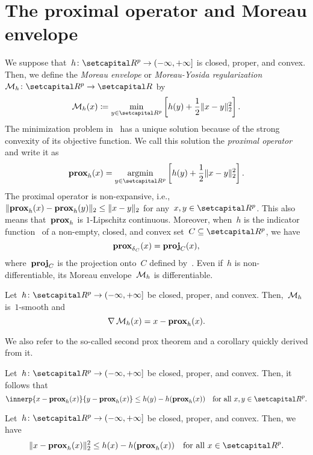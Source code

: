 \documentclass[../main]{subfiles}
\begin{document}
\section{The proximal operator and Moreau envelope}
We suppose that~$h \colon \setR^p \to (-\infty, +\infty]$ is closed, proper, and convex.
Then, we define the \emph{Moreau envelope} or \emph{Moreau-Yosida regularization}~$\envelope_h \colon \setR^p \to \setR$ by
\begin{equation} \label{eq:Moreau_env}
    \envelope_h(x) \coloneqq \min_{y \in \setR^p} \left[ h(y) + \frac{1}{2} \norm{x - y}_2^2 \right] 
.\end{equation} 
The minimization problem in~ has a unique solution because of the strong convexity of its objective function.
We call this solution the \emph{proximal operator} and write it as
\begin{equation} \label{eq:prox}
    \prox_h(x) = \argmin_{y \in \setR^p} \left[ h(y) + \frac{1}{2} \norm{x - y}_2^2 \right] 
.\end{equation} 
The proximal operator is non-expansive, i.e.,~$\lVert\operatorname{\mathbf{prox}}_h(x) - \operatorname{\mathbf{prox}}_h(y)\rVert_2 \le \lVert x - y\rVert_2$ for any~$x, y \in \setR^p$.
This also means that~$\operatorname{\mathbf{prox}}_h$ is $1$-Lipschitz continuous.
Moreover, when~$h$ is the indicator function~ of a non-empty, closed, and convex set~$C \subseteq \setR^p$, we have
\begin{equation} \label{eq:prox_ind}
    \operatorname{\mathbf{prox}}_{\operatorname{\delta}_C}(x) = \operatorname{\mathbf{proj}}_C(x)
,\end{equation} 
where~$\operatorname{\mathbf{proj}}_C$ is the projection onto~$C$ defined by~.
Even if~$h$ is non-differentiable, its Moreau envelope~$\operatorname{\mathcal{M}}_h$ is differentiable.
\begin{theorem} 
    Let~$h \colon \setR^p \to (-\infty, +\infty]$ be closed, proper, and convex.
    Then,~$\operatorname{\mathcal{M}}_h$ is~$1$-smooth and
    \begin{equation}
        \nabla \operatorname{\mathcal{M}}_h(x) = x - \operatorname{\mathbf{prox}}_h(x)
    .\end{equation} 
\end{theorem}
We also refer to the so-called second prox theorem and a corollary quickly derived from it.
\begin{theorem} 
    Let~$h \colon \setR^p \to (-\infty, +\infty]$ be closed, proper, and convex.
    Then, it follows that
    \begin{equation}
        \innerp{x - \prox_h(x)}{y - \prox_h(x)} \le h(y) - h(\prox_h(x)) \forallcondition{x, y \in \setR^p}
    .\end{equation} 
\end{theorem}
\begin{corollary} 
    Let~$h \colon \setR^p \to (-\infty, +\infty]$ be closed, proper, and convex.
    Then, we have
    \begin{equation}
        \norm{x - \prox_h(x)}_2^2 \le h(x) - h(\prox_h(x)) \forallcondition{x \in \setR^p}
    .\end{equation} 
\end{corollary}
\end{document}
